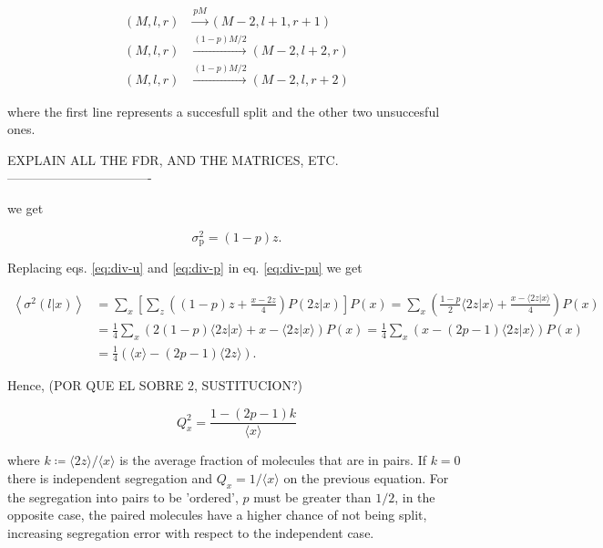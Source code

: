 \begin{equation}
  \begin{split}
    (M,l,r)&\xrightarrow{pM}(M-2,l+1,r+1)\\
    (M,l,r)&\xrightarrow{(1-p)M/2}(M-2,l+2,r)\\
    (M,l,r)&\xrightarrow{(1-p)M/2}(M-2,l,r+2)
  \end{split}
\end{equation}

where the first line represents a succesfull split and the other two unsuccesful ones.

EXPLAIN ALL THE FDR, AND THE MATRICES, ETC.
----------------------------------

we get

\begin{equation}
  \label{eq:div-p}
  \sigma^2_\text{p}=(1-p)z.
\end{equation}

Replacing eqs. \eqref{eq:div-u} and \eqref{eq:div-p} in eq. \eqref{eq:div-pu} we get

\begin{equation}
  \begin{split}
    \left\langle\sigma^2(l|x)\right\rangle &=\sum_{x}\left[\sum_z\left((1-p)z+\frac{x-2z}{4}\right)P(2z|x)\right]P(x) = \sum_x\left(\frac{1-p}{2}\langle 2z|x\rangle+\frac{x-\langle 2z|x\rangle}{4}\right)P(x)\\
    &=\frac{1}{4}\sum_x\left(2(1-p)\langle 2z|x\rangle+x-\langle 2z|x\rangle\right)P(x) = \frac{1}{4}\sum_x\left(x-(2p-1)\langle 2z|x\rangle\right)P(x)\\
    &=\frac{1}{4}\left(\langle x\rangle - (2p-1)\langle 2z\rangle\right).
  \end{split}
\end{equation}

Hence, (POR QUE EL SOBRE 2, SUSTITUCION?)

\begin{equation}
  \boxed{Q_x^2 = \frac{1 - (2p-1)k}{\langle x\rangle}}
\end{equation}

where $k\coloneqq\langle 2z\rangle/\langle x\rangle$ is the average fraction of molecules that are in pairs. If $k=0$ there is independent segregation and $Q_x = 1/\langle x\rangle$ on the previous equation. For the segregation into pairs to be 'ordered', $p$ must be greater than $1/2$, in the opposite case, the paired molecules have a higher chance of not being split, increasing segregation error with respect to the independent case.
